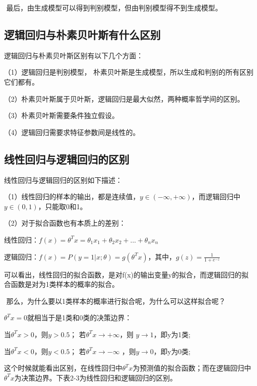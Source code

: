 ​ 最后，由生成模型可以得到判别模型，但由判别模型得不到生成模型。

\subsection{逻辑回归与朴素贝叶斯有什么区别}\label{ux903bux8f91ux56deux5f52ux4e0eux6734ux7d20ux8d1dux53f6ux65afux6709ux4ec0ux4e48ux533aux522b}

逻辑回归与朴素贝叶斯区别有以下几个方面：

（1）逻辑回归是判别模型，
朴素贝叶斯是生成模型，所以生成和判别的所有区别它们都有。

（2）朴素贝叶斯属于贝叶斯，逻辑回归是最大似然，两种概率哲学间的区别。

（3）朴素贝叶斯需要条件独立假设。

（4）逻辑回归需要求特征参数间是线性的。

\subsection{线性回归与逻辑回归的区别}\label{ux7ebfux6027ux56deux5f52ux4e0eux903bux8f91ux56deux5f52ux7684ux533aux522b}

线性回归与逻辑回归的区别如下描述：

（1）线性回归的样本的输出，都是连续值，$y \in (-\infty ,+\infty )$，而逻辑回归中
$y \in (0,1)$，只能取0和1。

（2）对于拟合函数也有本质上的差别：

​
线性回归：$f(x)=\theta ^{T}x=\theta _{1}x _{1}+\theta _{2}x _{2}+...+\theta _{n}x _{n}$

​
逻辑回归：$f(x)=P(y=1|x;\theta )=g(\theta ^{T}x)$，其中，$g(z)=\frac{1}{1+e^{-z}}$

​
可以看出，线性回归的拟合函数，是对f(x)的输出变量y的拟合，而逻辑回归的拟合函数是对为1类样本的概率的拟合。

​ 那么，为什么要以1类样本的概率进行拟合呢，为什么可以这样拟合呢？

​ $\theta ^{T}x=0$就相当于是1类和0类的决策边界：

​
当$\theta ^{T}x>0$，则$y>0.5$；
若$\theta ^{T}x\rightarrow +\infty $，则
$y\rightarrow  1 $，即y为1类;

​
当$\theta ^{T}x<0$，则$y<0.5$；
若$\theta ^{T}x\rightarrow -\infty$ ，则$y\rightarrow  0 $，即y为0类;

这个时候就能看出区别，在线性回归中$\theta ^{T}x$为预测值的拟合函数；而在逻辑回归中$\theta ^{T}x$为决策边界。下表2-3为线性回归和逻辑回归的区别。

